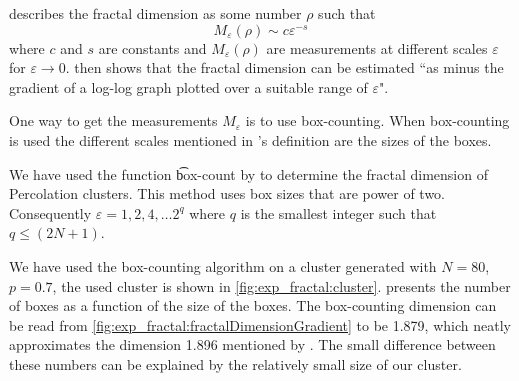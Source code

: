 
\textcite{falconer2004fractal} describes the fractal dimension as some number $\rho$ such that
\begin{equation}
	M_\varepsilon(\rho) \sim c\varepsilon^{-s}
\end{equation}
where $c$ and $s$ are constants and $M_\varepsilon(\rho)$ are measurements at different scales $\varepsilon$ for $\varepsilon \to 0$. \citeauthor{falconer2004fractal} then shows that the fractal dimension can be estimated ``as minus the gradient of a log-log graph plotted over a suitable range of $\varepsilon$"\cite{falconer2004fractal}. 

One way to get the measurements $M_\varepsilon$ is to use box-counting. When box-counting is used the different scales mentioned in \citeauthor{falconer2004fractal}'s definition are the sizes of the boxes. 

We have used the function \t{box-count} by \textcite{boxCounting} to determine the fractal dimension of Percolation clusters. This method uses box sizes that are power of two. Consequently $\varepsilon = 1, 2, 4, \dotsc 2^q$ where $q$ is the smallest integer such that $q \leq (2N + 1)$. 

We have used the box-counting algorithm on a cluster generated with $N = 80$, $p = 0.7$, the used cluster is shown in \cref{fig:exp_fractal:cluster}.  presents the number of boxes as a function of the size of the boxes.  The box-counting dimension can be read from \cref{fig:exp_fractal:fractalDimensionGradient} to be \num{1.879}, which neatly approximates the dimension \num{1.896} mentioned by \textcite{stauffer1994introduction}. The small difference between these numbers can be explained by the relatively small size of our cluster. 

